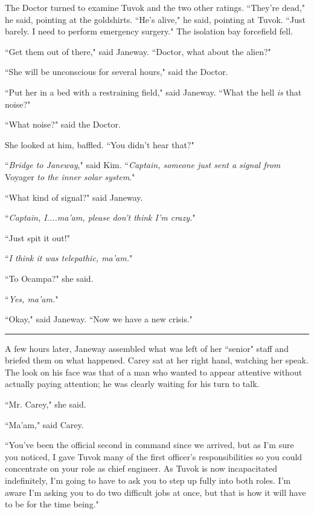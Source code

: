 \documentclass[twoside,letterpaper,12pt]{memoir}
\begin{document}
The Doctor turned to examine Tuvok and the two other ratings. ``They're dead," he said, pointing at the goldshirts. ``He's alive," he said, pointing at Tuvok. ``Just barely. I need to perform emergency surgery." The isolation bay forcefield fell. 

``Get them out of there," said Janeway. ``Doctor, what about the alien?" 

``She will be unconscious for several hours," said the Doctor. 

``Put her in a bed with a restraining field," said Janeway. ``What the hell \textit{is} that noise?" 

``What noise?" said the Doctor. 

She looked at him, baffled. ``You didn't hear that?" 

``\textit{Bridge to Janeway}," said Kim. ``\textit{Captain, someone just sent a signal from }Voyager\textit{ to the inner solar system}." 

``What kind of signal?" said Janeway. 

``\textit{Captain, I....ma'am, please don't think I'm crazy.}" 

``Just spit it out!" 

``\textit{I think it was telepathic, ma'am.}" 

``To Ocampa?" she said. 

``\textit{Yes, ma'am.}" 

``Okay," said Janeway. ``Now we have a new crisis." 

\begin{center}\rule{3cm}{0.4 pt}\end{center} 

A few hours later, Janeway assembled what was left of her ``senior" staff and briefed them on what happened. Carey sat at her right hand, watching her speak. The look on his face was that of a man who wanted to appear attentive without actually paying attention; he was clearly waiting for his turn to talk. 

``Mr. Carey," she said. 

``Ma'am," said Carey. 

``You've been the official second in command since we arrived, but as I'm sure you noticed, I gave Tuvok many of the first officer's responsibilities so you could concentrate on your role as chief engineer. As Tuvok is now incapacitated indefinitely, I'm going to have to ask you to step up fully into both roles. I'm aware I'm asking you to do two difficult jobs at once, but that is how it will have to be for the time being." 
\end{document}
